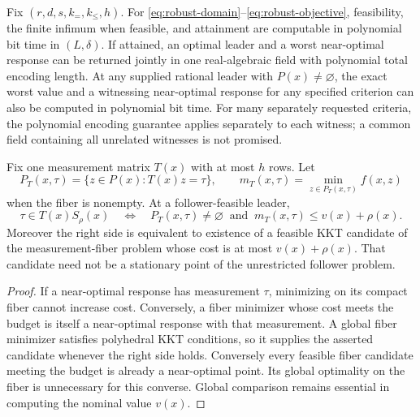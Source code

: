 \begin{theorem}\label{thm:nearoptimal-robust}
Fix $(r,d,s,k_=,k_{\le},h)$. For
\eqref{eq:robust-domain}--\eqref{eq:robust-objective}, feasibility, the
finite infimum when feasible, and attainment are computable in polynomial
bit time in $(L,\delta)$. If attained, an optimal leader and a worst
near-optimal response can be returned jointly in one real-algebraic field
with polynomial total encoding length. At any supplied rational leader
with $P(x)\ne\varnothing$, the exact worst value and a witnessing
near-optimal response for any specified criterion can also be computed
in polynomial bit time. For many separately requested criteria, the
polynomial encoding guarantee applies separately to each witness;
a common field containing all unrelated witnesses is not promised.
\end{theorem}

\begin{lemma}\label{lem:measurement-threshold}
Fix one measurement matrix $T(x)$ with at most $h$ rows. Let
\[
 P_T(x,\tau)=\{z\in P(x):T(x)z=\tau\},\qquad
 m_T(x,\tau)=\min_{z\in P_T(x,\tau)} f(x,z)
\]
when the fiber is nonempty. At a follower-feasible leader,
\begin{equation}\label{eq:measurement-threshold}
 \tau\in T(x)S_\rho(x)\quad\Longleftrightarrow\quad
 P_T(x,\tau)\ne\varnothing\ \text{ and }\
                       m_T(x,\tau)\le v(x)+\rho(x).
\end{equation}
Moreover the right side is equivalent to existence of a feasible KKT
candidate of the measurement-fiber problem whose cost is at most
$v(x)+\rho(x)$. That candidate need not be a stationary point of the
unrestricted follower problem.
\end{lemma}
\begin{proof}
If a near-optimal response has measurement $\tau$, minimizing on its
compact fiber cannot increase cost. Conversely, a fiber minimizer whose
cost meets the budget is itself a near-optimal response with that
measurement. A global fiber minimizer satisfies polyhedral KKT conditions,
so it supplies the asserted candidate whenever the right side holds.
Conversely every feasible fiber candidate meeting the budget is already
a near-optimal point. Its global optimality on the fiber is unnecessary
for this converse. Global comparison remains essential in computing the
nominal value $v(x)$.
\end{proof}


